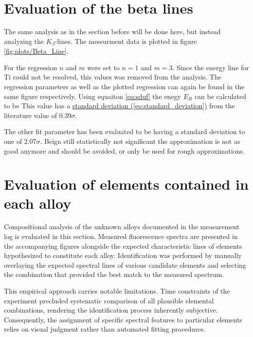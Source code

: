 \section{Evaluation of the beta lines}
\label{sec:A2}
The same analysis as in the section before will be done here, but instead analyzing the $K_\beta$-lines. The messurment data is plotted in figure \ref{fig:plots/Beta_Line}. 

For the regression $n$ and $m$ were set to $n=1$ and $m=3$. Since the energy line for Ti could not be resolved, this values was removed from the analysis. The regression parameters as well as the plotted regression can again be found in the same figure respectively. Using equaiton \ref{eq:sduf} the enegy $E_R$ can be calculated to be
This value has a \hyperref[eq:standard_deviation]{standard deviation (\ref*{eq:standard_deviation})} from the literature value of $0.39 \sigma$.

The other fit parameter has been evaluated to be
having a standard deviation to one of $2.07 \sigma$. Beign still statistically not significant the approximation is not as good anymore and should be avoided, or only be used for rough approximations.



\section{Evaluation of elements contained in each alloy}
\label{sec:A3}

Compositional analysis of the unknown alloys documented in the measurement log is evaluated in this section. Measured fluorescence spectra are presented in the accompanying figures alongside the expected characteristic lines of elements hypothesized to constitute each alloy. Identification was performed by manually overlaying the expected spectral lines of various candidate elements and selecting the combination that provided the best match to the measured spectrum.

This empirical approach carries notable limitations. Time constraints of the experiment precluded systematic comparison of all plausible elemental combinations, rendering the identification process inherently subjective. Consequently, the assignment of specific spectral features to particular elements relies on visual judgment rather than automated fitting procedures. 

